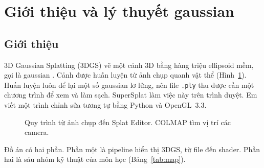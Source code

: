 \documentclass[9pt,twocolumn,a4paper]{extarticle}
\newcommand{\code}[1]{\texttt{#1}}
\begin{document}
\section{Giới thiệu và lý thuyết gaussian}
\label{chap:theory}

\subsection{Giới thiệu}
3D Gaussian Splatting (3DGS) vẽ một cảnh 3D bằng hàng triệu ellipsoid mềm, gọi là gaussian \cite{kerbl2023gaussian}. Cảnh được huấn luyện từ ảnh chụp quanh vật thể (Hình~\ref{fig:pipeline}). Huấn luyện luôn để lại một số gaussian lơ lửng, nên file \code{.ply} thu được cần một chương trình để xem và làm sạch. SuperSplat \cite{supersplat} làm việc này trên trình duyệt. Em viết một trình chỉnh sửa tương tự bằng Python và OpenGL~3.3.

\begin{figure}[H]
\centering
{}
\caption{Quy trình từ ảnh chụp đến Splat Editor. COLMAP \cite{schonberger2016colmap} tìm vị trí các camera.}
\label{fig:pipeline}
\end{figure}

Đồ án có hai phần. Phần một là pipeline hiển thị 3DGS, từ file đến shader. Phần hai là sáu nhóm kỹ thuật của môn học (Bảng~\ref{tab:map}).
\end{document}
